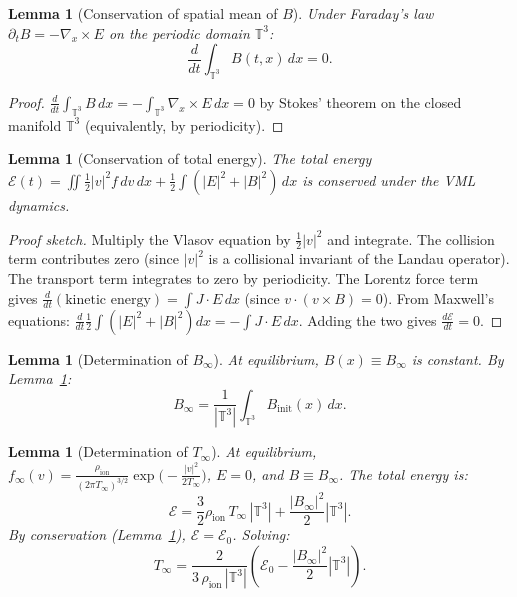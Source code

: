 \documentclass[11pt]{article}
\newcommand{\T}{\mathbb{T}}
\newtheorem{lemma}[theorem]{Lemma}
\begin{document}
\begin{lemma}[Conservation of spatial mean of $B$]
\label{lem:B_mean_conserved}
Under Faraday's law $\partial_t B = -\nabla_x \times E$ on the periodic domain $\T^3$:
\[
\frac{d}{dt} \int_{\T^3} B(t, x) \, dx = 0.
\]
\end{lemma}

\begin{proof}
$\frac{d}{dt} \int_{\T^3} B \, dx = -\int_{\T^3} \nabla_x \times E \, dx = 0$ by Stokes' theorem on the closed manifold $\T^3$ (equivalently, by periodicity).
\end{proof}

\begin{lemma}[Conservation of total energy]
\label{lem:energy_conserved}
The total energy $\mathcal{E}(t) = \iint \frac{1}{2}|v|^2 f \, dv \, dx + \frac{1}{2}\int(|E|^2 + |B|^2) \, dx$ is conserved under the VML dynamics.
\end{lemma}

\begin{proof}[Proof sketch]
Multiply the Vlasov equation by $\frac{1}{2}|v|^2$ and integrate. The collision term contributes zero (since $|v|^2$ is a collisional invariant of the Landau operator). The transport term integrates to zero by periodicity. The Lorentz force term gives $\frac{d}{dt}(\text{kinetic energy}) = \int J \cdot E \, dx$ (since $v \cdot (v \times B) = 0$). From Maxwell's equations: $\frac{d}{dt}\frac{1}{2}\int(|E|^2 + |B|^2) dx = -\int J \cdot E \, dx$. Adding the two gives $\frac{d\mathcal{E}}{dt} = 0$.
\end{proof}

\begin{lemma}[Determination of $B_\infty$]
\label{lem:B_infty}
At equilibrium, $B(x) \equiv B_\infty$ is constant. By Lemma~\ref{lem:B_mean_conserved}:
\[
B_\infty = \frac{1}{|\T^3|} \int_{\T^3} B_{\mathrm{init}}(x) \, dx.
\]
\end{lemma}

\begin{lemma}[Determination of $T_\infty$]
\label{lem:T_infty}
At equilibrium, $f_\infty(v) = \frac{\rho_{\mathrm{ion}}}{(2\pi T_\infty)^{3/2}} \exp\!\big(-\frac{|v|^2}{2T_\infty}\big)$, $E = 0$, and $B \equiv B_\infty$. The total energy is:
\[
\mathcal{E} = \frac{3}{2} \rho_{\mathrm{ion}} \, T_\infty \, |\T^3| + \frac{|B_\infty|^2}{2} |\T^3|.
\]
By conservation (Lemma~\ref{lem:energy_conserved}), $\mathcal{E} = \mathcal{E}_0$. Solving:
\[
T_\infty = \frac{2}{3 \, \rho_{\mathrm{ion}} \, |\T^3|} \left(\mathcal{E}_0 - \frac{|B_\infty|^2}{2}|\T^3|\right).
\]
\end{lemma}
\end{document}
